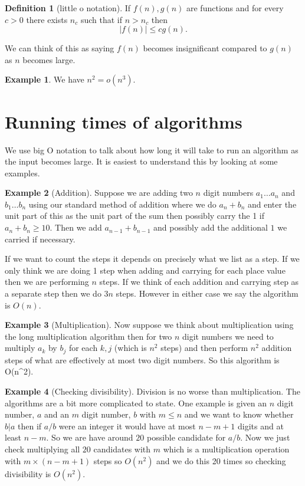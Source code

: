 \documentclass[
]{book}
\theoremstyle{definition}
\newtheorem{definition}{Definition}[chapter]
\theoremstyle{definition}
\newtheorem{example}{Example}[chapter]
\theoremstyle{definition}
\theoremstyle{definition}
\theoremstyle{remark}
\begin{document}
\begin{definition}[little o notation]
If \(f(n), g(n)\) are functions and for every \(c >0\) there exists \(n_c\) such that if \(n >n_c\) then
\[ |f(n)| \leq c g(n).\]

We can think of this as saying \(f(n)\) becomes insignificant compared to \(g(n)\) as \(n\) becomes large.
\end{definition}

\begin{example}
We have \(n^2 = o(n^3)\).
\end{example}

\section{Running times of algorithms}\label{running-times-of-algorithms}

We use big O notation to talk about how long it will take to run an algorithm as the input becomes large. It is easiest to understand this by looking at some examples.

\begin{example}[Addition]
Suppose we are adding two \(n\) digit numbers \(a_1\dots a_n\) and \(b_1\dots b_n\) using our standard method of addition where we do \(a_n+b_n\) and enter the unit part of this as the unit part of the sum then possibly carry the 1 if \(a_n + b_n \geq 10\). Then we add \(a_{n-1} + b_{n-1}\) and possibly add the additional \(1\) we carried if necessary.

If we want to count the steps it depends on precisely what we list as a step. If we only think we are doing 1 step when adding and carrying for each place value then we are performing \(n\) steps. If we think of each addition and carrying step as a separate step then we do \(3n\) steps. However in either case we say the algorithm is \(O(n)\).
\end{example}

\begin{example}[Multiplication]
Now suppose we think about multiplication using the long multiplication algorithm then for two \(n\) digit numbers we need to multiply \(a_k\) by \(b_j\) for each \(k, j\) (which is \(n^2\) steps) and then perform \(n^2\) addition steps of what are effectively at most two digit numbers. So this algorithm is O(n\^{}2).
\end{example}

\begin{example}[Checking divisibility]
Division is no worse than multiplication. The algorithms are a bit more complicated to state. One example is given an \(n\) digit number, \(a\) and an \(m\) digit number, \(b\) with \(m\leq n\) and we want to know whether \(b|a\) then if \(a/b\) were an integer it would have at most \(n-m+1\) digits and at least \(n-m\). So we are have around \(20\) possible candidate for \(a/b\). Now we just check multiplying all \(20\) candidates with \(m\) which is a multiplication operation with \(m\times(n-m+1)\) steps so \(O(n^2)\) and we do this 20 times so checking divisibility is \(O(n^2)\).
\end{example}
\end{document}
